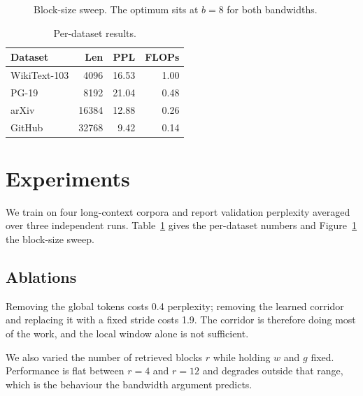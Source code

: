 \documentclass[11pt,twocolumn]{article}
\begin{document}
\begin{figure}[t]
\centering
{}
\caption{Block-size sweep. The optimum sits at $b=8$ for both bandwidths.}
\label{fig:sweep}
\end{figure}

\begin{table}[t]
\centering
\caption{Per-dataset results.}
\label{tab:results}
\begin{tabular}{lrrr}
\toprule
Dataset & Len & PPL & FLOPs \\
\midrule
WikiText-103 & 4096 & 16.53 & 1.00 \\
PG-19        & 8192 & 21.04 & 0.48 \\
arXiv        & 16384 & 12.88 & 0.26 \\
GitHub       & 32768 & 9.42 & 0.14 \\
\bottomrule
\end{tabular}
\end{table}

\section{Experiments}
\label{sec:exp}
We train on four long-context corpora and report validation perplexity averaged
over three independent runs. Table~\ref{tab:results} gives the per-dataset
numbers and Figure~\ref{fig:sweep} the block-size sweep.

\subsection{Ablations}
Removing the global tokens costs 0.4 perplexity; removing the learned corridor
and replacing it with a fixed stride costs 1.9. The corridor is therefore doing
most of the work, and the local window alone is not sufficient.

We also varied the number of retrieved blocks $r$ while holding $w$ and $g$
fixed. Performance is flat between $r=4$ and $r=12$ and degrades outside that
range, which is the behaviour the bandwidth argument predicts.
\end{document}

